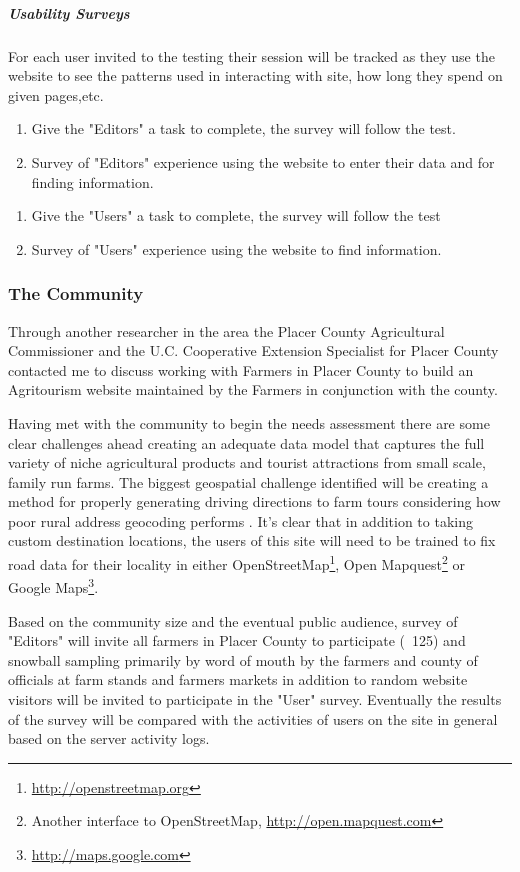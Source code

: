 \documentclass[12pt,letterpaper]{article}
\begin{document}
\subparagraph{Usability Surveys}
For each user invited to the testing their session will be tracked as they use the website to see the patterns used in interacting with site, how long they spend on given pages,etc.
\begin{enumerate}
	\item Give the "Editors" a task to complete, the survey will follow the test.
	
	\item Survey of "Editors" experience using the website to enter their data and for finding information.
\end{enumerate}
\begin{enumerate}
	\item Give the "Users" a task to complete, the survey will follow the test
	\item Survey of "Users" experience using the website to find information.
\end{enumerate}

\subsubsection{The Community}
	Through another researcher in the area the Placer County Agricultural Commissioner and the U.C. Cooperative Extension Specialist for Placer County contacted me to discuss working with Farmers in Placer County to build an Agritourism website maintained by the Farmers in conjunction with the county.
	
	Having met with the community to begin the needs assessment there are some clear challenges ahead creating an adequate data model that captures the full variety of niche agricultural products and tourist attractions from small scale, family run farms. The biggest geospatial challenge identified will be creating a method for properly generating driving directions to farm tours considering how poor rural address geocoding performs \parencite{Armstrong2005}. It's clear that in addition to taking custom destination locations, the users of this site will need to be trained to fix road data for their locality in either OpenStreetMap\footnote{\url{http://openstreetmap.org}}, Open Mapquest\footnote{Another interface to OpenStreetMap, \url{http://open.mapquest.com}} or Google Maps\footnote{\url{http://maps.google.com}}.
	
	Based on the community size and the eventual public audience, survey of "Editors" will invite all farmers in Placer County to participate (~125) and snowball sampling primarily by word of mouth by the farmers and county of officials at farm stands and farmers markets in addition to random website visitors will be invited to participate in the "User" survey. Eventually the results of the survey will be compared with the activities of users on the site in general based on the server activity logs.
	
\end{document}
